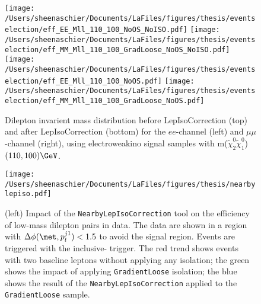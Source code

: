   \begin{figure}[tbp]
     \texttt{[image: /Users/sheenaschier/Documents/LaFiles/figures/thesis/eventselection/eff\_EE\_Mll\_110\_100\_NoOS\_NoISO.pdf]}
       \texttt{[image: /Users/sheenaschier/Documents/LaFiles/figures/thesis/eventselection/eff\_MM\_Mll\_110\_100\_GradLoose\_NoOS\_NoISO.pdf]}\\
     \texttt{[image: /Users/sheenaschier/Documents/LaFiles/figures/thesis/eventselection/eff\_EE\_Mll\_110\_100\_NoOS.pdf]}
     \texttt{[image: /Users/sheenaschier/Documents/LaFiles/figures/thesis/eventselection/eff\_MM\_Mll\_110\_100\_GradLoose\_NoOS.pdf]}\\
   \caption{Dilepton invarient mass distribution before LepIsoCorrection (top) and after LepIsoCorrection (bottom) for the $ee$-channel (left) and $\mu\mu$-channel (right), using electroweakino signal samples with m($\tilde\chi_2^0\tilde\chi_1^0$) $(110, 100)\GeV$.}
   \label{fig:EffMll_ISOCorr}
 \end{figure}
 \begin{figure}[tbp]
  \texttt{[image: /Users/sheenaschier/Documents/LaFiles/figures/thesis/nearbylepiso.pdf]}
  \caption{(left) Impact of the \texttt{NearbyLepIsoCorrection} tool on the efficiency of low-mass dilepton pairs in data.  The data are shown in a region with $\Delta\phi(\met, p_{t}^{j1})<1.5$ to avoid the signal region.  Events are triggered with the inclusive-\met{} trigger.  The red trend shows events with two baseline leptons without applying any isolation; the green shows the impact of applying \texttt{GradientLoose} isolation; the blue shows the result of the \texttt{NearbyLepIsoCorrection} applied to the \texttt{GradientLoose} sample.  %
  }
 \label{fig:nearbylepiso}
 \end{figure}
 

 
 


